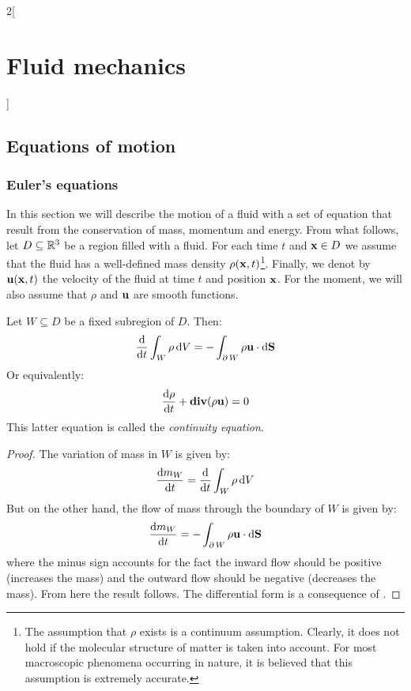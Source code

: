 \documentclass[../../../main_physics.tex]{subfiles}
\begin{document}
\renewcommand{\col}{\phy}
\begin{multicols}{2}[\section{Fluid mechanics}]
  \subsection{Equations of motion}
  \subsubsection{Euler's equations}
  In this section we will describe the motion of a fluid with a set of equation that result from the conservation of mass, momentum and energy. From what follows, let $D\subseteq \mathbb{R}^3$ be a region filled with a fluid. For each time $t$ and $\boldsymbol{\mathrm{x}}\in D$ we assume that the fluid has a well-defined mass density $\rho(\boldsymbol{\mathrm{x}},t)$\footnote{The assumption that $\rho$ exists is a continuum assumption. Clearly, it does not hold if the molecular structure of matter is taken into account. For most macroscopic phenomena occurring in nature, it is believed that this assumption is extremely accurate.}. Finally, we denot by $\boldsymbol{\mathrm{u}}(\boldsymbol{\mathrm{x}},t)$ the velocity of the fluid at time $t$ and position $\boldsymbol{\mathrm{x}}$. For the moment, we will also assume that $\rho$ and $\boldsymbol{\mathrm{u}}$ are smooth functions.
  \begin{proposition}\label{FLM:conservationofmass}
    Let $W\subseteq D$ be a fixed subregion of $D$. Then:
    $$
      \dv{}{t}\int_W\rho\dd{V}=-\int_{\operatorname{\partial}{W}}\rho\boldsymbol{\mathrm{u}}\cdot\dd{\boldsymbol{\mathrm{S}}}
    $$
    Or equivalently:
    \begin{equation}\label{FLM:continuityequation}
      \dv{\rho}{t}+\operatorname{\boldsymbol{\mathrm{div}}}(\rho\boldsymbol{\mathrm{u}})=0
    \end{equation}
    This latter equation is called the \emph{continuity equation}.
  \end{proposition}
  \begin{proof}
    The variation of mass in $W$ is given by:
    $$
      \dv{m_W}{t}=\dv{}{t} \int_W\rho\dd{V}
    $$
    But on the other hand, the flow of mass through the boundary of $W$ is given by:
    $$
      \dv{m_W}{t}=-\int_{\operatorname{\partial}{W}}\rho\boldsymbol{\mathrm{u}}\cdot\dd{\boldsymbol{\mathrm{S}}}
    $$
    where the minus sign accounts for the fact the inward flow should be positive (increases the mass) and the outward flow should be negative (decreases the mass). From here the result follows. The differential form is a consequence of .

\end{proof}
\end{multicols}
\end{document}

